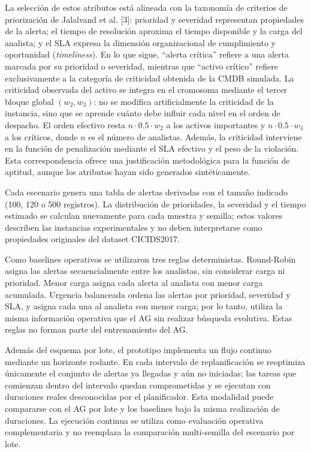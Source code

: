 \documentclass[12pt,a4paper,twocolumn]{article}
\begin{document}
La selección de estos atributos está alineada con la taxonomía de criterios de priorización de Jalalvand et al. [3]: prioridad y severidad representan propiedades de la alerta; el tiempo de resolución aproxima el tiempo disponible y la carga del analista; y el SLA expresa la dimensión organizacional de cumplimiento y oportunidad (\textit{timeliness}). En lo que sigue, ``alerta crítica'' refiere a una alerta marcada por su prioridad o severidad, mientras que ``activo crítico'' refiere exclusivamente a la categoría de criticidad obtenida de la CMDB simulada. La criticidad observada del activo se integra en el cromosoma mediante el tercer bloque global $(w_2,w_3)$: no se modifica artificialmente la criticidad de la instancia, sino que se aprende cuánto debe influir cada nivel en el orden de despacho. El orden efectivo resta $n \cdot 0.5 \cdot w_2$ a los activos importantes y $n \cdot 0.5 \cdot w_3$ a los críticos, donde $n$ es el número de analistas. Además, la criticidad interviene en la función de penalización mediante el SLA efectivo y el peso de la violación. Esta correspondencia ofrece una justificación metodológica para la función de aptitud, aunque los atributos hayan sido generados sintéticamente.

Cada escenario genera una tabla de alertas derivadas con el tamaño indicado (100, 120 o 500 registros). La distribución de prioridades, la severidad y el tiempo estimado se calculan nuevamente para cada muestra y semilla; estos valores describen las instancias experimentales y no deben interpretarse como propiedades originales del dataset CICIDS2017.

Como baselines operativos se utilizaron tres reglas deterministas. Round-Robin asigna las alertas secuencialmente entre los analistas, sin considerar carga ni prioridad. Menor carga asigna cada alerta al analista con menor carga acumulada. Urgencia balanceada ordena las alertas por prioridad, severidad y SLA, y asigna cada una al analista con menor carga; por lo tanto, utiliza la misma información operativa que el AG sin realizar búsqueda evolutiva. Estas reglas no forman parte del entrenamiento del AG.

Además del esquema por lote, el prototipo implementa un flujo continuo mediante un horizonte rodante. En cada intervalo de replanificación se reoptimiza únicamente el conjunto de alertas ya llegadas y aún no iniciadas; las tareas que comienzan dentro del intervalo quedan comprometidas y se ejecutan con duraciones reales desconocidas por el planificador. Esta modalidad puede compararse con el AG por lote y los baselines bajo la misma realización de duraciones. La ejecución continua se utiliza como evaluación operativa complementaria y no reemplaza la comparación multi-semilla del escenario por lote.
\end{document}
